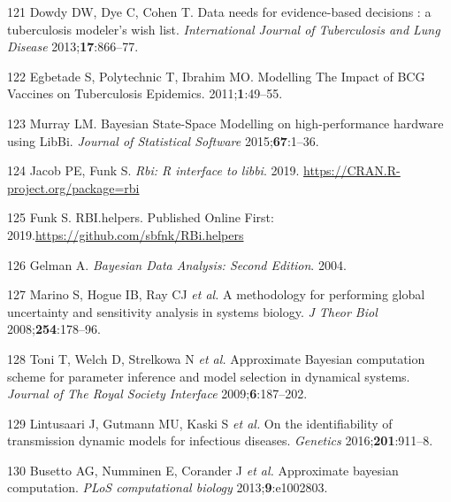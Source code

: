 \documentclass[11pt,twoside]{bristolthesis}
\begin{document}
  \leavevmode\hypertarget{ref-Dowdy2012}{}%
  121 Dowdy DW, Dye C, Cohen T. Data needs for evidence-based decisions : a tuberculosis modeler's wish list. \emph{International Journal of Tuberculosis and Lung Disease} 2013;\textbf{17}:866--77.
  
  \leavevmode\hypertarget{ref-Egbetade2011a}{}%
  122 Egbetade S, Polytechnic T, Ibrahim MO. Modelling The Impact of BCG Vaccines on Tuberculosis Epidemics. 2011;\textbf{1}:49--55.
  
  \leavevmode\hypertarget{ref-Murray2015}{}%
  123 Murray LM. Bayesian State-Space Modelling on high-performance hardware using LibBi. \emph{Journal of Statistical Software} 2015;\textbf{67}:1--36.
  
  \leavevmode\hypertarget{ref-Funk:2019ud}{}%
  124 Jacob PE, Funk S. \emph{Rbi: R interface to libbi}. 2019. \url{https://CRAN.R-project.org/package=rbi}
  
  \leavevmode\hypertarget{ref-Funk:2019uw}{}%
  125 Funk S. RBI.helpers. Published Online First: 2019.\url{https://github.com/sbfnk/RBi.helpers}
  
  \leavevmode\hypertarget{ref-Gelman:nll_LBlw}{}%
  126 Gelman A. \emph{Bayesian Data Analysis: Second Edition}. 2004.
  
  \leavevmode\hypertarget{ref-Marino2009a}{}%
  127 Marino S, Hogue IB, Ray CJ \emph{et al.} A methodology for performing global uncertainty and sensitivity analysis in systems biology. \emph{J Theor Biol} 2008;\textbf{254}:178--96.
  
  \leavevmode\hypertarget{ref-Toni2009}{}%
  128 Toni T, Welch D, Strelkowa N \emph{et al.} Approximate Bayesian computation scheme for parameter inference and model selection in dynamical systems. \emph{Journal of The Royal Society Interface} 2009;\textbf{6}:187--202.
  
  \leavevmode\hypertarget{ref-Lintusaari2016}{}%
  129 Lintusaari J, Gutmann MU, Kaski S \emph{et al.} On the identifiability of transmission dynamic models for infectious diseases. \emph{Genetics} 2016;\textbf{201}:911--8.
  
  \leavevmode\hypertarget{ref-Busetto2013}{}%
  130 Busetto AG, Numminen E, Corander J \emph{et al.} Approximate bayesian computation. \emph{PLoS computational biology} 2013;\textbf{9}:e1002803.


\end{document}
